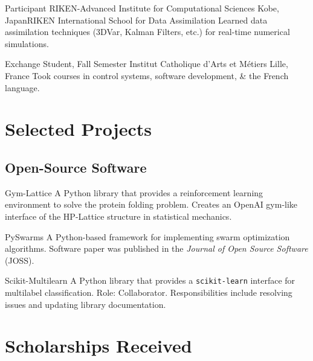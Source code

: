 \documentclass[11pt,a4paper,sans]{moderncv}
\begin{document}
        {Participant}
        {RIKEN-Advanced Institute for Computational Sciences}
        {Kobe, Japan}{RIKEN International School for Data Assimilation}
        {Learned data assimilation techniques (3DVar, Kalman Filters, etc.) for real-time numerical simulations.}

        {Exchange Student, Fall Semester}
        {Institut Catholique d'Arts et M\'etiers}
        {Lille, France}{}
        {Took courses in control systems, software development, \& the French
        language.
        }

\section{Selected Projects}

\subsection{Open-Source Software}

        {\color{blue} }
        {Gym-Lattice}{}{}
        {
        A Python library that provides a reinforcement learning environment
        to solve the protein folding problem. Creates an OpenAI gym-like
        interface of the HP-Lattice structure in statistical mechanics.
        }

        {\color{blue} }
        {PySwarms}{}{}
        {
        A Python-based framework for implementing swarm optimization
        algorithms. Software paper was published in the \textit{Journal of Open
        Source Software} (JOSS).
        }

        {\color{blue} }
        {Scikit-Multilearn}{}{}
        {
        A Python library that provides a \texttt{scikit-learn} interface for
        multilabel classification. Role: Collaborator. Responsibilities include
        resolving issues and updating library documentation.
        }

\section{Scholarships Received}

\nocite{*}


\end{document}
